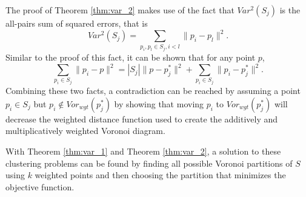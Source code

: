 \documentclass[a4paper, 11pt]{article}
\begin{document}
The proof of Theorem \ref{thm:var_2} makes use of the fact that $Var^2(S_j)$ is the all-pairs sum of squared errors, that is
\begin{equation}
  Var^2(S_j) = \sum_{p_i, p_l \in S_j, i<l} \|p_i - p_l\|^2.
  \label{eq:all_sums}
\end{equation}
Similar to the proof of this fact, it can be shown that for any point $p$,
\begin{equation}
  \sum_{p_i \in S_j} \| p_i - p \|^2 = |S_j| \|p - p_j^\ast\|^2 + \sum_{p_i \in S_j} \| p_i - p_j^\ast \|^2.
  \label{eq:wgt_vor}
\end{equation}
Combining these two facts, a contradiction can be reached by assuming a point $p_i \in S_j$ but $p_i \not\in Vor_{wgt}(p_j^\ast)$ by showing that
moving $p_i$ to $Vor_{wgt}(p_j^\ast)$ will decrease the weighted distance function used to create the additively and multiplicatively weighted Voronoi
diagram.

With Theorem \ref{thm:var_1} and Theorem \ref{thm:var_2}, a solution to these clustering problems can be found by finding all possible Voronoi
partitions of $S$ using $k$ weighted points and then choosing the partition that minimizes the objective function.

\printbibliography
\end{document}
